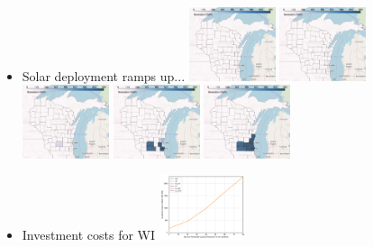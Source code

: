 \documentclass[xcolor=dvipsnames]{beamer}
\begin{document}
\begin{frame}
\begin{itemize}
  \item Solar deployment ramps up...
  \includegraphics[width=0.2\textwidth]{includes/no_leakage_maxNR_solar_r0.png}
  \includegraphics[width=0.2\textwidth]{includes/no_leakage_maxNR_solar_r1.png}
  \includegraphics[width=0.2\textwidth]{includes/no_leakage_maxNR_solar_r2.png}
  \includegraphics[width=0.2\textwidth]{includes/no_leakage_maxNR_solar_r3.png}
  \includegraphics[width=0.2\textwidth]{includes/no_leakage_maxNR_solar_r4.png}

  \item Investment costs for WI
  \includegraphics[width=0.2\textwidth]{includes/no_leakage_maxNR_invest_costs_by_region.png}


\end{itemize}
\end{frame}
\end{document}
